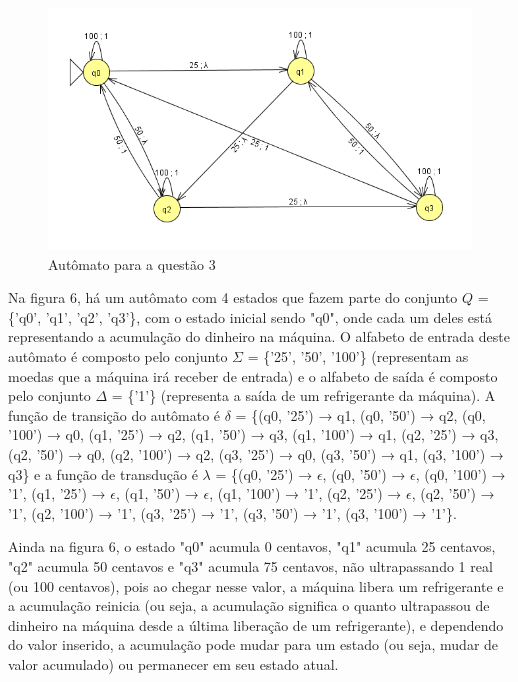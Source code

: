 \documentclass[12pt]{article}
\begin{document}
\begin{figure}[H]
\centering
\includegraphics[width=1.1\textwidth]{images/questao 3 mealy.pdf} 
\caption{Autômato para a questão 3}
\label{fig:regexExplanation}
\end{figure}

Na figura 6, há um autômato com 4 estados que fazem parte do conjunto $Q$ = \{'q0', 'q1', 'q2', 'q3'\}, com o estado inicial sendo "q0", onde cada um deles está representando a acumulação do dinheiro na máquina. O alfabeto de entrada deste autômato é composto pelo conjunto $\Sigma$ = \{'25', '50', '100'\} (representam as moedas que a máquina irá receber de entrada) e o alfabeto de saída é composto pelo conjunto $\Delta$ = \{'1'\} (representa a saída de um refrigerante da máquina). A função de transição do autômato é $\delta$ = \{(q0, '25') → q1, (q0, '50') → q2, (q0, '100') → q0, (q1, '25') → q2, (q1, '50') → q3, (q1, '100') → q1, (q2, '25') → q3, (q2, '50') → q0, (q2, '100') → q2, (q3, '25') → q0, (q3, '50') → q1, (q3, '100') → q3\} e a função de transdução é $\lambda$ = \{(q0, '25') → $\epsilon$, (q0, '50') → $\epsilon$, (q0, '100') → '1', (q1, '25') → $\epsilon$, (q1, '50') → $\epsilon$, (q1, '100') → '1', (q2, '25') → $\epsilon$, (q2, '50') → '1', (q2, '100') → '1', (q3, '25') → '1', (q3, '50') → '1', (q3, '100') → '1'\}. 

Ainda na figura 6, o estado "q0" acumula 0 centavos, "q1" acumula 25 centavos, "q2" acumula 50 centavos e "q3" acumula 75 centavos, não ultrapassando 1 real (ou 100 centavos), pois ao chegar nesse valor, a máquina libera um refrigerante e a acumulação reinicia (ou seja, a acumulação significa o quanto ultrapassou de dinheiro na máquina desde a última liberação de um refrigerante), e dependendo do valor inserido, a acumulação pode mudar para um estado (ou seja, mudar de valor acumulado) ou permanecer em seu estado atual.
\end{document}
